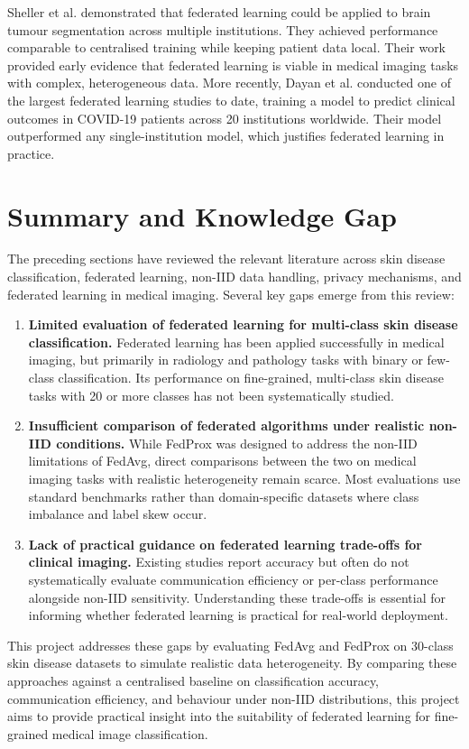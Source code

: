 \documentclass[12pt,openany,a4paper]{book}
\begin{document}
Sheller et al. \cite{shellerFederatedLearningMedicine2020} demonstrated that federated learning could be applied to brain tumour segmentation across multiple institutions. They achieved performance comparable to centralised training while keeping patient data local. Their work provided early evidence that federated learning is viable in medical imaging tasks with complex, heterogeneous data. More recently, Dayan et al. \cite{dayanFederatedLearningPredicting2021} conducted one of the largest federated learning studies to date, training a model to predict clinical outcomes in COVID-19 patients across 20 institutions worldwide. Their model outperformed any single-institution model, which justifies federated learning in practice.

\section{Summary and Knowledge Gap}
The preceding sections have reviewed the relevant literature across skin disease classification, federated learning, non-IID data handling, privacy mechanisms, and federated learning in medical imaging. Several key gaps emerge from this review:
\begin{enumerate}
\item \textbf{Limited evaluation of federated learning for multi-class skin disease classification.} Federated learning has been applied successfully in medical imaging, but primarily in radiology and pathology tasks with binary or few-class classification. Its performance on fine-grained, multi-class skin disease tasks with 20 or more classes has not been systematically studied.
\item \textbf{Insufficient comparison of federated algorithms under realistic non-IID conditions.} While FedProx was designed to address the non-IID limitations of FedAvg, direct comparisons between the two on medical imaging tasks with realistic heterogeneity remain scarce. Most evaluations use standard benchmarks rather than domain-specific datasets where class imbalance and label skew occur.
\item \textbf{Lack of practical guidance on federated learning trade-offs for clinical imaging.} Existing studies report accuracy but often do not systematically evaluate communication efficiency or per-class performance alongside non-IID sensitivity. Understanding these trade-offs is essential for informing whether federated learning is practical for real-world deployment.
\end{enumerate}
This project addresses these gaps by evaluating FedAvg and FedProx on 30-class skin disease datasets to simulate realistic data heterogeneity. By comparing these approaches against a centralised baseline on classification accuracy, communication efficiency, and behaviour under non-IID distributions, this project aims to provide practical insight into the suitability of federated learning for fine-grained medical image classification.
\end{document}
